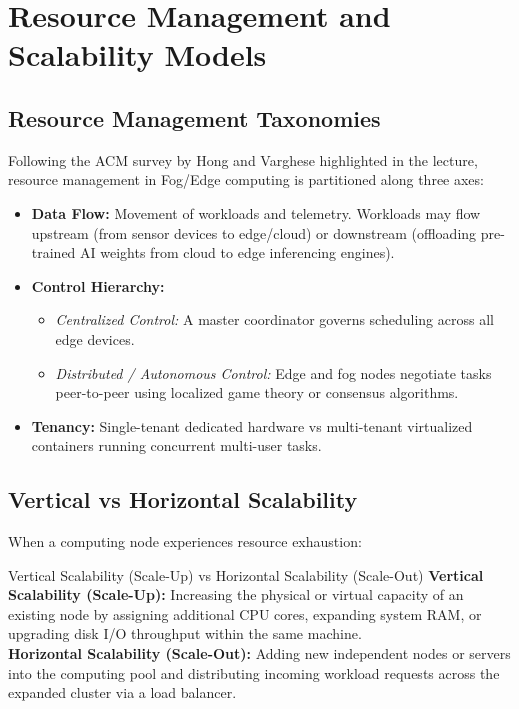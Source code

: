 \documentclass[11pt,a4paper,openany]{report}
\begin{document}
\section{Resource Management and Scalability Models}
\subsection{Resource Management Taxonomies}
Following the ACM survey by Hong and Varghese highlighted in the lecture, resource management in Fog/Edge computing is partitioned along three axes:
\begin{itemize}[leftmargin=*]
  \item \textbf{Data Flow:} Movement of workloads and telemetry. Workloads may flow upstream (from sensor devices to edge/cloud) or downstream (offloading pre-trained AI weights from cloud to edge inferencing engines).
  \item \textbf{Control Hierarchy:}
    \begin{itemize}
      \item \emph{Centralized Control:} A master coordinator governs scheduling across all edge devices.
      \item \emph{Distributed / Autonomous Control:} Edge and fog nodes negotiate tasks peer-to-peer using localized game theory or consensus algorithms.
    \end{itemize}
  \item \textbf{Tenancy:} Single-tenant dedicated hardware vs multi-tenant virtualized containers running concurrent multi-user tasks.
\end{itemize}

\subsection{Vertical vs Horizontal Scalability}
When a computing node experiences resource exhaustion:
\begin{defbox}{Vertical Scalability (Scale-Up) vs Horizontal Scalability (Scale-Out)}
\textbf{Vertical Scalability (Scale-Up):} Increasing the physical or virtual capacity of an existing node by assigning additional CPU cores, expanding system RAM, or upgrading disk I/O throughput within the same machine.\\
\textbf{Horizontal Scalability (Scale-Out):} Adding new independent nodes or servers into the computing pool and distributing incoming workload requests across the expanded cluster via a load balancer.
\end{defbox}
\end{document}

